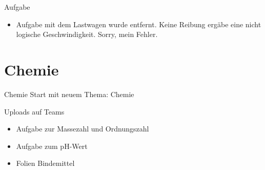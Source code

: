 \begin{frame}
    \begin{block}{Aufgabe}
        \begin{itemize}
            \item[\textbullet] Aufgabe mit dem Lastwagen wurde entfernt. Keine Reibung ergäbe eine nicht logische Geschwindigkeit. Sorry, mein Fehler.
        \end{itemize}
    \end{block}
\end{frame}



\section{Chemie}
\begin{frame}{Chemie}
    Start mit neuem Thema: Chemie
\end{frame}




\begin{frame}{Uploads auf Teams}
    \begin{itemize}
        \item [\textbullet] Aufgabe zur Massezahl und Ordnungszahl
        \item [\textbullet] Aufgabe zum pH-Wert
        \item [\textbullet] Folien Bindemittel

    \end{itemize}
\end{frame}

\folieFragen



